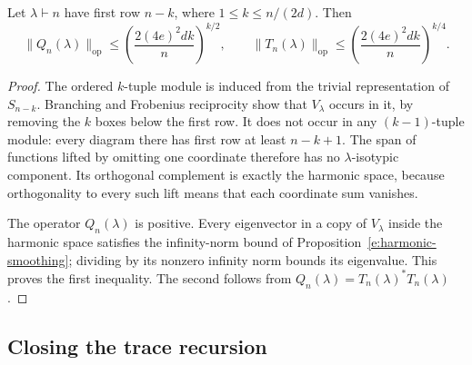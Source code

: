 \begin{corollary}\label{e:harmonic-singular-conversion}
Let $\lambda\vdash n$ have first row $n-k$, where $1\le k\le n/(2d)$.
Then
\[
 \|Q_n(\lambda)\|_{\mathrm{op}}
 \le \left(\frac{2(4e)^2dk}{n}\right)^{k/2},
 \qquad
 \|T_n(\lambda)\|_{\mathrm{op}}
 \le \left(\frac{2(4e)^2dk}{n}\right)^{k/4}.
\]
\end{corollary}
\begin{proof}
The ordered $k$-tuple module is induced from the trivial representation of
$S_{n-k}$. Branching and Frobenius reciprocity show that $V_\lambda$
occurs in it, by removing the $k$ boxes below the first row. It does not
occur in any $(k-1)$-tuple module: every diagram there has first row at
least $n-k+1$. The span of functions lifted by omitting one coordinate
therefore has no $\lambda$-isotypic component. Its orthogonal complement
is exactly the harmonic space, because orthogonality to every such lift
means that each coordinate sum vanishes.

The operator $Q_n(\lambda)$ is positive. Every eigenvector in a copy of
$V_\lambda$ inside the harmonic space satisfies the infinity-norm bound
of Proposition~\ref{e:harmonic-smoothing}; dividing by its nonzero
infinity norm bounds its eigenvalue. This proves the first inequality.
The second follows from $Q_n(\lambda)=T_n(\lambda)^*T_n(\lambda)$.
\end{proof}
\subsection{Closing the trace recursion}

